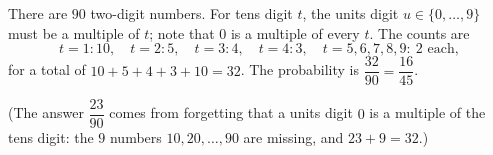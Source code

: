 There are $90$ two-digit numbers. For tens digit $t$, the units digit $u\in\{0,\dots,9\}$ must be a multiple of $t$; note that $0$ is a multiple of every $t$. The counts are
\[
t=1:10,\quad t=2:5,\quad t=3:4,\quad t=4:3,\quad t=5,6,7,8,9:\ 2\text{ each},
\]
for a total of $10+5+4+3+10=32$. The probability is $\dfrac{32}{90}=\boxed{\dfrac{16}{45}}$.

(The answer $\dfrac{23}{90}$ comes from forgetting that a units digit $0$ is a multiple of the tens digit: the $9$ numbers $10,20,\dots,90$ are missing, and $23+9=32$.)
